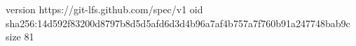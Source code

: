version https://git-lfs.github.com/spec/v1
oid sha256:14d592f83200d8797b8d5d5afd6d3d4b96a7af4b757a7f760b91a247748bab9c
size 81
